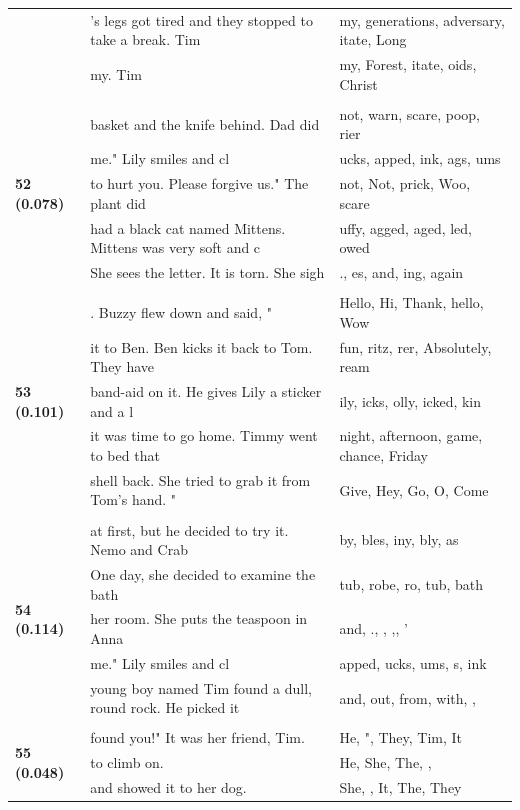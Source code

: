 \documentclass{article}
\theoremstyle{plain}
\theoremstyle{definition}
\theoremstyle{remark}
\begin{document}
\begin{longtable}{|p{}|p{}|p{}|}
& 's legs got tired and they stopped to take a break. Tim & my,  generations,  adversary, itate, Long \\
& my. Tim & my, Forest, itate, oids,  Christ \\
& & \\
\multirow{5}{*}{\textbf{52 (0.078)}} & basket and the knife behind.  Dad did & not,  warn,  scare,  poop, rier \\
& me."  Lily smiles and cl & ucks, apped, ink, ags, ums \\
& to hurt you. Please forgive us."  The plant did & not,  Not,  prick,  Woo,  scare \\
& had a black cat named Mittens. Mittens was very soft and c & uffy, agged, aged, led, owed \\
& She sees the letter. It is torn. She sigh & ., es,  and, ing,  again \\
& & \\
\multirow{5}{*}{\textbf{53 (0.101)}} & .  Buzzy flew down and said, " & Hello, Hi, Thank, hello, Wow \\
& it to Ben. Ben kicks it back to Tom. They have & fun, ritz, rer,  Absolutely, ream \\
& band-aid on it. He gives Lily a sticker and a l & ily, icks, olly, icked, kin \\
& it was time to go home. Timmy went to bed that & night,  afternoon,  game,  chance,  Friday \\
& shell back. She tried to grab it from Tom's hand.  " & Give, Hey, Go, O, Come \\
& & \\
\multirow{5}{*}{\textbf{54 (0.114)}} & at first, but he decided to try it.  Nemo and Crab & by, bles, iny, bly, as \\
& One day, she decided to examine the bath & tub, robe, ro,  tub,  bath \\
& her room. She puts the teaspoon in Anna & and, ., , ,, ' \\
& me."  Lily smiles and cl & apped, ucks, ums, s, ink \\
& young boy named Tim found a dull, round rock. He picked it & and,  out,  from,  with, , \\
& & \\
\multirow{5}{*}{\textbf{55 (0.048)}} & found you!" It was her friend, Tim. & He,  ",  They,  Tim,  It \\
& to climb on. & He,  She,  The,  , \\
& and showed it to her dog. & She,  ,  It,  The,  They \\

\end{longtable}
\end{document}
